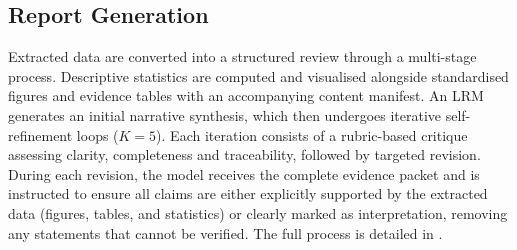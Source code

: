 \subsection{Report Generation}
Extracted data are converted into a structured review through a multi-stage process. Descriptive statistics are computed and visualised alongside standardised figures and evidence tables with an accompanying content manifest. An LRM generates an initial narrative synthesis, which then undergoes iterative self-refinement loops ($K=5$). Each iteration consists of a rubric-based critique assessing clarity, completeness and traceability, followed by targeted revision. During each revision, the model receives the complete evidence packet and is instructed to ensure all claims are either explicitly supported by the extracted data (figures, tables, and statistics) or clearly marked as interpretation, removing any statements that cannot be verified. The full process is detailed in .